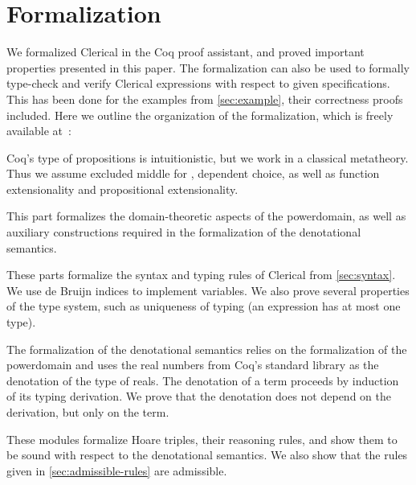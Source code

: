 \section{Formalization}
\label{sec:formalization}

We formalized Clerical in the Coq proof assistant, and proved important properties presented in this paper. 
The formalization can also be used to formally type-check and verify Clerical expressions with respect to given specifications.
This has been done for the examples from \cref{sec:example}, their correctness proofs included.
%
Here we outline the organization of the formalization, which is freely available at~\cite{clerical_coq}:
%
\begin{description}[style=nextline,font=\normalfont]
\item[\coqpath{BaseAxioms}]
  Coq's type of propositions  is intuitionistic, but we work in a classical
  metatheory. Thus we assume excluded middle for , dependent choice, as well as function extensionality and propositional extensionality.

\item[\coqpath{Powerdomain}]
  This part formalizes the domain-theoretic aspects of the powerdomain, as well as auxiliary constructions
  required in the formalization of the denotational semantics.

\item[\coqpath{Syntax}, \coqpath{Typing}, \coqpath{TypingProperties}]
  These parts formalize the syntax and typing rules of Clerical from \cref{sec:syntax}.
  We use de Bruijn indices to implement variables. We also prove several properties of the
  type system, such as uniqueness of typing (an expression has at most one type).

\item[\coqpath{Semantics}, \coqpath{SemanticProperties}]
  The formalization of the denotational semantics relies on the formalization of the powerdomain and uses the real numbers from Coq's standard library as the denotation of the type of reals.
  The denotation of a term proceeds by induction of its typing derivation. We prove that the denotation does not
  depend on the derivation, but only on the term.

\item[\coqpath{Specification}, \coqpath{ReasoningRules}, \coqpath{ReasoningSoundness}, \coqpath{ReasoningAdmissible}]
  These modules formalize Hoare triples, their reasoning rules, and show them to be sound with respect
  to the denotational semantics. We also show that the rules given in \cref{sec:admissible-rules} are admissible.


\end{description}
